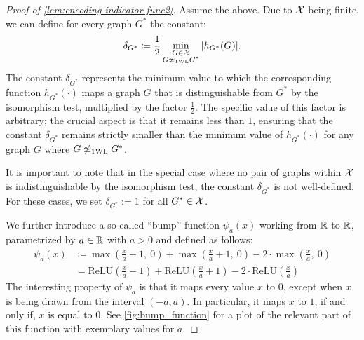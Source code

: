 \begin{proof}[Proof of \cref{lem:encoding-indicator-func2}]
    Assume the above. Due to $\mathcal{X}$ being finite, we can define for every graph $G^*$ the constant:
    \begin{equation*}
        \delta_{G^*} \coloneqq \frac{1}{2} \min_{\substack{G \in \mathcal{X}  \\  G \not\simeq_{\text{1WL}} G^*}} |h_{G^*}(G)|.
    \end{equation*}
    The constant $\delta_{G^*}$ represents the minimum value to which the corresponding function $h_{G^*}(\cdot)$ maps a graph $G$ that is distinguishable from $G^*$ by the \wl isomorphism test, multiplied by the factor $\frac{1}{2}$. The specific value of this factor is arbitrary; the crucial aspect is that it remains less than $1$, ensuring that the constant $\delta_{G^*}$ remains strictly smaller than the minimum value of $h_{G^*}(\cdot)$ for any graph $G$ where $G\not \simeq_{\text{1WL}} G^*$.

    It is important to note that in the special case where no pair of graphs within $\mathcal{X}$ is indistinguishable by the \wl isomorphism test, the constant $\delta_{G^*}$ is not well-defined. For these cases, we set $\delta_{G^*} := 1$ for all $G^* \in \mathcal{X}$.

    We further introduce a so-called ``bump'' function $\psi_a(x)$ working from $\mathbb{R}$ to $\mathbb{R}$, parametrized by $a \in \mathbb{R}$ with $a > 0$ and defined as follows:
    \begin{align}\label{eq:lemma_encoding_indicator_func2}
        \psi_a(x) &\coloneqq \max(\frac{x}{a} -1,\ 0) + \max(\frac{x}{a}+1, \ 0) - 2 \cdot \max(\frac{x}{a}, \ 0) \nonumber\\
        &= \text{ReLU}(\frac{x}{a} -1) + \text{ReLU}(\frac{x}{a}+1) - 2 \cdot \text{ReLU}(\frac{x}{a})
    \end{align}
    The interesting property of $\psi_a$ is that it maps every value $x$ to $0$, except when $x$ is being drawn from the interval $(-a, a)$. In particular, it maps $x$ to $1$, if and only if, $x$ is equal to $0$. See \cref{fig:bump_function} for a plot of the relevant part of this function with exemplary values for $a$.


\end{proof}
